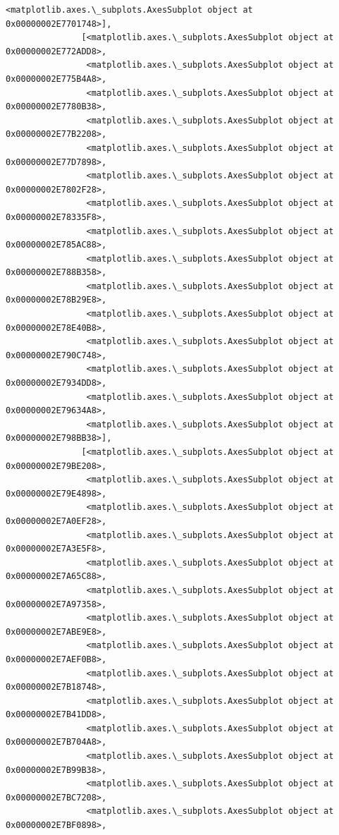 \documentclass[11pt]{article}
\begin{document}
\begin{Verbatim}[commandchars=\\\{\}]
                <matplotlib.axes.\_subplots.AxesSubplot object at 0x00000002E7701748>],
               [<matplotlib.axes.\_subplots.AxesSubplot object at 0x00000002E772ADD8>,
                <matplotlib.axes.\_subplots.AxesSubplot object at 0x00000002E775B4A8>,
                <matplotlib.axes.\_subplots.AxesSubplot object at 0x00000002E7780B38>,
                <matplotlib.axes.\_subplots.AxesSubplot object at 0x00000002E77B2208>,
                <matplotlib.axes.\_subplots.AxesSubplot object at 0x00000002E77D7898>,
                <matplotlib.axes.\_subplots.AxesSubplot object at 0x00000002E7802F28>,
                <matplotlib.axes.\_subplots.AxesSubplot object at 0x00000002E78335F8>,
                <matplotlib.axes.\_subplots.AxesSubplot object at 0x00000002E785AC88>,
                <matplotlib.axes.\_subplots.AxesSubplot object at 0x00000002E788B358>,
                <matplotlib.axes.\_subplots.AxesSubplot object at 0x00000002E78B29E8>,
                <matplotlib.axes.\_subplots.AxesSubplot object at 0x00000002E78E40B8>,
                <matplotlib.axes.\_subplots.AxesSubplot object at 0x00000002E790C748>,
                <matplotlib.axes.\_subplots.AxesSubplot object at 0x00000002E7934DD8>,
                <matplotlib.axes.\_subplots.AxesSubplot object at 0x00000002E79634A8>,
                <matplotlib.axes.\_subplots.AxesSubplot object at 0x00000002E798BB38>],
               [<matplotlib.axes.\_subplots.AxesSubplot object at 0x00000002E79BE208>,
                <matplotlib.axes.\_subplots.AxesSubplot object at 0x00000002E79E4898>,
                <matplotlib.axes.\_subplots.AxesSubplot object at 0x00000002E7A0EF28>,
                <matplotlib.axes.\_subplots.AxesSubplot object at 0x00000002E7A3E5F8>,
                <matplotlib.axes.\_subplots.AxesSubplot object at 0x00000002E7A65C88>,
                <matplotlib.axes.\_subplots.AxesSubplot object at 0x00000002E7A97358>,
                <matplotlib.axes.\_subplots.AxesSubplot object at 0x00000002E7ABE9E8>,
                <matplotlib.axes.\_subplots.AxesSubplot object at 0x00000002E7AEF0B8>,
                <matplotlib.axes.\_subplots.AxesSubplot object at 0x00000002E7B18748>,
                <matplotlib.axes.\_subplots.AxesSubplot object at 0x00000002E7B41DD8>,
                <matplotlib.axes.\_subplots.AxesSubplot object at 0x00000002E7B704A8>,
                <matplotlib.axes.\_subplots.AxesSubplot object at 0x00000002E7B99B38>,
                <matplotlib.axes.\_subplots.AxesSubplot object at 0x00000002E7BC7208>,
                <matplotlib.axes.\_subplots.AxesSubplot object at 0x00000002E7BF0898>,

\end{Verbatim}
\end{document}
